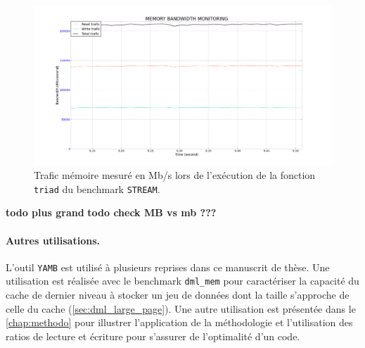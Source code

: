         
        \begin{figure}
        \center
        \includegraphics[width=14cm]{images/yamb_stream_triad.png}
        \caption{\label{pic:yamb_stream_triad} Trafic mémoire mesuré en Mb/s lors de l'exécution de la fonction \texttt{triad} du benchmark \texttt{STREAM}.}
        \end{figure} \textbf{todo plus grand}
        \textbf{todo check MB vs mb ???}

     
        \paragraph{Autres utilisations.} L'outil \verb|YAMB| est utilisé à plusieurs reprises dans ce manuscrit de thèse. Une utilisation est réalisée avec le benchmark \verb=dml_mem= pour caractériser la capacité du cache de dernier niveau à stocker un jeu de données dont la taille s'approche de celle du cache (\autoref{sec:dml_large_page}). Une autre utilisation est présentée dans le \autoref{chap:methodo} pour illustrer l'application de la méthodologie et l'utilisation des ratios de lecture et écriture pour s'assurer de l'optimalité d'un code.
        
     